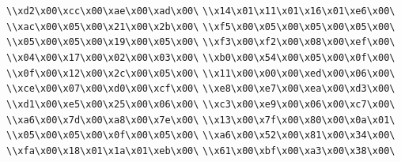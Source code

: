 \verb|\\xd2\x00\xcc\x00\xae\x00\xad\x00\|\newline
\verb|\\x14\x01\x11\x01\x16\x01\xe6\x00\|\newline
\verb|\\xac\x00\x05\x00\x21\x00\x2b\x00\|\newline
\verb|\\xf5\x00\x05\x00\x05\x00\x05\x00\|\newline
\verb|\\x05\x00\x05\x00\x19\x00\x05\x00\|\newline
\verb|\\xf3\x00\xf2\x00\x08\x00\xef\x00\|\newline
\verb|\\x04\x00\x17\x00\x02\x00\x03\x00\|\newline
\verb|\\xb0\x00\x54\x00\x05\x00\x0f\x00\|\newline
\verb|\\x0f\x00\x12\x00\x2c\x00\x05\x00\|\newline
\verb|\\x11\x00\x00\x00\xed\x00\x06\x00\|\newline
\verb|\\xce\x00\x07\x00\xd0\x00\xcf\x00\|\newline
\verb|\\xe8\x00\xe7\x00\xea\x00\xd3\x00\|\newline
\verb|\\xd1\x00\xe5\x00\x25\x00\x06\x00\|\newline
\verb|\\xc3\x00\xe9\x00\x06\x00\xc7\x00\|\newline
\verb|\\xa6\x00\x7d\x00\xa8\x00\x7e\x00\|\newline
\verb|\\x13\x00\x7f\x00\x80\x00\x0a\x01\|\newline
\verb|\\x05\x00\x05\x00\x0f\x00\x05\x00\|\newline
\verb|\\xa6\x00\x52\x00\x81\x00\x34\x00\|\newline
\verb|\\xfa\x00\x18\x01\x1a\x01\xeb\x00\|\newline
\verb|\\x61\x00\xbf\x00\xa3\x00\x38\x00\|\newline
